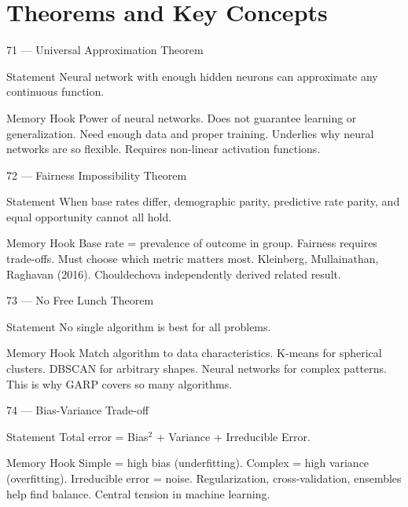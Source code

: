 \documentclass[aspectratio=169,8pt]{beamer}
\begin{document}
	\section{Theorems and Key Concepts}
	
	\begin{frame}{71 --- Universal Approximation Theorem}
		\begin{block}{Statement}
			Neural network with enough hidden neurons can approximate any continuous function.
		\end{block}
		\begin{block}{Memory Hook}
			Power of neural networks. Does not guarantee learning or generalization. Need enough data and proper training. Underlies why neural networks are so flexible. Requires non-linear activation functions.
		\end{block}
	\end{frame}
	
	\begin{frame}{72 --- Fairness Impossibility Theorem}
		\begin{block}{Statement}
			When base rates differ, demographic parity, predictive rate parity, and equal opportunity cannot all hold.
		\end{block}
		\begin{block}{Memory Hook}
			Base rate = prevalence of outcome in group. Fairness requires trade-offs. Must choose which metric matters most. Kleinberg, Mullainathan, Raghavan (2016). Chouldechova independently derived related result.
		\end{block}
	\end{frame}
	
	\begin{frame}{73 --- No Free Lunch Theorem}
		\begin{block}{Statement}
			No single algorithm is best for all problems.
		\end{block}
		\begin{block}{Memory Hook}
			Match algorithm to data characteristics. K-means for spherical clusters. DBSCAN for arbitrary shapes. Neural networks for complex patterns. This is why GARP covers so many algorithms.
		\end{block}
	\end{frame}
	
	\begin{frame}{74 --- Bias-Variance Trade-off}
		\begin{block}{Statement}
			Total error = Bias$^2$ + Variance + Irreducible Error.
		\end{block}
		\begin{block}{Memory Hook}
			Simple = high bias (underfitting). Complex = high variance (overfitting). Irreducible error = noise. Regularization, cross-validation, ensembles help find balance. Central tension in machine learning.
		\end{block}
	\end{frame}
	
\end{document}
